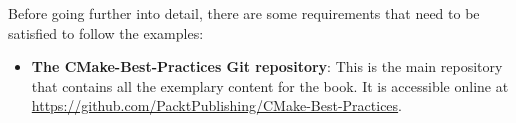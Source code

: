 Before going further into detail, there are some requirements that need to be satisfied to follow the examples:

\begin{itemize}
\item 
\textbf{The CMake-Best-Practices Git repository}: This is the main repository that contains all the exemplary content for the book. It is accessible online at \url{https://github.com/PacktPublishing/CMake-Best-Practices}.
\end{itemize}


